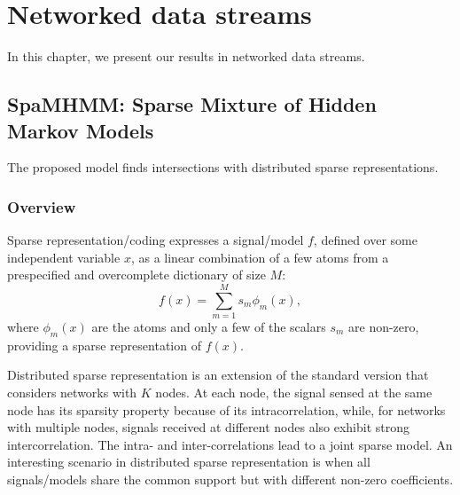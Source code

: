 
\chapter{Networked data streams}


\label{chp:background}


In this chapter, we present our results in networked data streams.

\section{SpaMHMM: Sparse Mixture of Hidden Markov Models}
\label{sec:spamhmm}
The proposed model finds intersections with distributed sparse representations.  

\subsection{Overview}
Sparse representation/coding expresses a signal/model $f$, defined over some independent variable $x$, as a linear combination of a few atoms from a prespecified and overcomplete dictionary of size $M$:
\begin{equation}
\label{sparse_coding}
f(x)=\sum_{m=1}^M s_m \phi_m(x),
\end{equation}
where $\phi_m(x)$ are the atoms and only a few of the scalars $s_m$ are non-zero, providing a sparse representation of $f(x)$.

Distributed sparse representation \cite{Baron} is an extension of the standard version that considers networks with $K$ nodes.
At each node, the signal sensed at the same node has its sparsity property because of its intracorrelation, while, for networks with multiple nodes, signals received at different nodes also exhibit strong intercorrelation.
The intra- and inter-correlations lead to a joint sparse model. An interesting scenario in distributed sparse representation is when all signals/models share the common support but with different non-zero coefficients.


